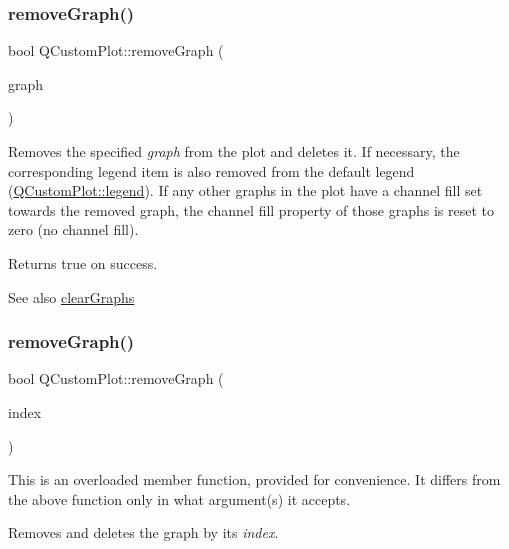 \subsubsection{\texorpdfstring{remove\+Graph()}{removeGraph()}\hspace{0.1cm}{\footnotesize\ttfamily [1/2]}}
{\footnotesize\ttfamily bool Q\+Custom\+Plot\+::remove\+Graph (\begin{DoxyParamCaption}\item[{\hyperlink{class_q_c_p_graph}{Q\+C\+P\+Graph} $\ast$}]{graph }\end{DoxyParamCaption})}

Removes the specified {\itshape graph} from the plot and deletes it. If necessary, the corresponding legend item is also removed from the default legend (\hyperlink{class_q_custom_plot_a4eadcd237dc6a09938b68b16877fa6af}{Q\+Custom\+Plot\+::legend}). If any other graphs in the plot have a channel fill set towards the removed graph, the channel fill property of those graphs is reset to zero (no channel fill).

Returns true on success.

\begin{DoxySeeAlso}{See also}
\hyperlink{class_q_custom_plot_ab0f3abff2d2f7df3668b5836f39207fa}{clear\+Graphs} 
\end{DoxySeeAlso}
\mbox{\label{class_q_custom_plot_a9554b3d2d5b10c0f884bd4010b6c192c}} 
\subsubsection{\texorpdfstring{remove\+Graph()}{removeGraph()}\hspace{0.1cm}{\footnotesize\ttfamily [2/2]}}
{\footnotesize\ttfamily bool Q\+Custom\+Plot\+::remove\+Graph (\begin{DoxyParamCaption}\item[{int}]{index }\end{DoxyParamCaption})}

This is an overloaded member function, provided for convenience. It differs from the above function only in what argument(s) it accepts.

Removes and deletes the graph by its {\itshape index}. \mbox{\label{class_q_custom_plot_ae04446557292551e8fb6e2c106e1848d}} 
